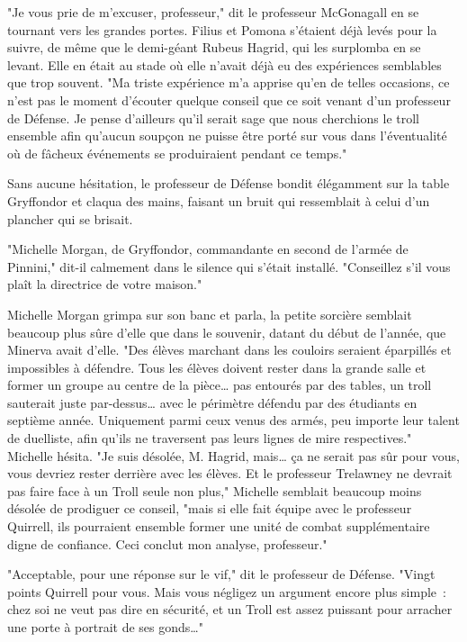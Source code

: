 "Je vous prie de m'excuser, professeur," dit le professeur McGonagall en se tournant vers les grandes portes. Filius et Pomona s'étaient déjà levés pour la suivre, de même que le demi-géant Rubeus Hagrid, qui les surplomba en se levant. Elle en était au stade où elle n'avait déjà eu des expériences semblables que trop souvent. "Ma triste expérience m'a apprise qu'en de telles occasions, ce n'est pas le moment d'écouter quelque conseil que ce soit venant d'un professeur de Défense. Je pense d'ailleurs qu'il serait sage que nous cherchions le troll ensemble afin qu'aucun soupçon ne puisse être porté sur vous dans l'éventualité où de fâcheux événements se produiraient pendant ce temps."

Sans aucune hésitation, le professeur de Défense bondit élégamment sur la table Gryffondor et claqua des mains, faisant un bruit qui ressemblait à celui d'un plancher qui se brisait.

"Michelle Morgan, de Gryffondor, commandante en second de l'armée de Pinnini," dit-il calmement dans le silence qui s'était installé. "Conseillez s'il vous plaît la directrice de votre maison."

Michelle Morgan grimpa sur son banc et parla, la petite sorcière semblait beaucoup plus sûre d'elle que dans le souvenir, datant du début de l'année, que Minerva avait d'elle. "Des élèves marchant dans les couloirs seraient éparpillés et impossibles à défendre. Tous les élèves doivent rester dans la grande salle et former un groupe au centre de la pièce… pas entourés par des tables, un troll sauterait juste par-dessus… avec le périmètre défendu par des étudiants en septième année. Uniquement parmi ceux venus des armés, peu importe leur talent de duelliste, afin qu'ils ne traversent pas leurs lignes de mire respectives." Michelle hésita. "Je suis désolée, M. Hagrid, mais… ça ne serait pas sûr pour vous, vous devriez rester derrière avec les élèves. Et le professeur Trelawney ne devrait pas faire face à un Troll seule non plus," Michelle semblait beaucoup moins désolée de prodiguer ce conseil, "mais si elle fait équipe avec le professeur Quirrell, ils pourraient ensemble former une unité de combat supplémentaire digne de confiance. Ceci conclut mon analyse, professeur."

"Acceptable, pour une réponse sur le vif," dit le professeur de Défense. "Vingt points Quirrell pour vous. Mais vous négligez un argument encore plus simple~: chez soi ne veut pas dire en sécurité, et un Troll est assez puissant pour arracher une porte à portrait de ses gonds…"

